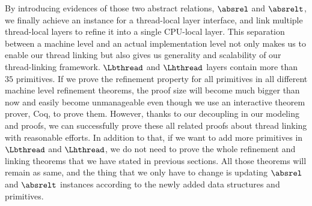 By introducing evidences of those two abstract relations, $\absrel$ and $\absrelt$, we finally achieve an instance for a thread-local layer interface, and link multiple thread-local layers to refine it into a single CPU-local layer.
This separation between a machine level and an actual implementation level not only makes us to enable our thread linking but also
gives us generality and scalability 
of our thread-linking framework.
$\Lbthread$ and $\Lhthread$ layers contain more than $35$ primitives. 
If we prove the refinement property for all primitives in all different machine level refinement theorems, 
the proof size will become much bigger than now and 
easily become unmanageable even though we use an interactive theorem prover, Coq, to prove them. 
However, thanks to our decoupling in our modeling and proofs, we can successfully prove these all related proofs about thread linking with reasonable efforts.
In addition to that,
if we want to add more primitives in $\Lbthread$  and $\Lhthread$, we do not need to prove the whole refinement and linking theorems 
that we have stated in previous sections. 
All those theorems will remain as same, and
the thing that we only have to change is updating $\absrel$ and $\absrelt$ instances according to the newly added data structures and primitives.




%
%
%
%
%
%
%
%

